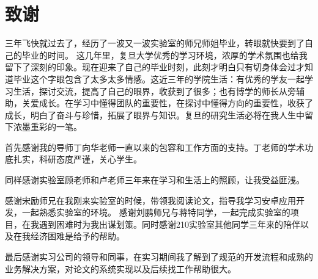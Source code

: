 \chapter{致谢}

三年飞快就过去了，经历了一波又一波实验室的师兄师姐毕业，转眼就快要到了自己的毕业的时间。 
这几年里，复旦大学优秀的学习环境，浓厚的学术氛围也给我留下了深刻的印象。现在迎来了自己的毕业时刻，此刻才明白只有切身体会过才知道毕业这个字眼包含了太多太多情感。这近三年的学院生活：有优秀的学友一起学习生活，探讨交流，提高了自己的眼界，收获到了很多；也有博学的师长从旁辅助，关爱成长。在学习中懂得团队的重要性，在探讨中懂得方向的重要性，收获了成长，明白了奋斗与珍惜，拓展了眼界与知识。复旦的研究生活必将在我人生中留下浓墨重彩的一笔。

首先感谢我的导师丁向华老师一直以来的包容和工作方面的支持。丁老师的学术功底扎实，科研态度严谨，关心学生。

同样感谢实验室顾老师和卢老师三年来在学习和生活上的照顾，让我受益匪浅。

感谢宋励师兄在我刚来实验室的时候，带领我阅读论文，指导我学习安卓应用开发，一起熟悉实验室的环境。 
感谢刘鹏师兄与蒋特同学，一起完成实验室的项目，在我遇到困难时为我出谋划策。同时感谢210实验室其他同学三年来的陪伴以及在我经济困难是给予的帮助。

最后感谢实习公司的领导和同事，在实习期间我了解到了规范的开发流程和成熟的业务解决方案，对论文的系统实现以及后续找工作帮助很大。